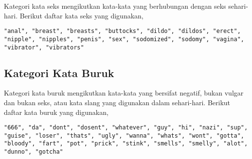 Kategori kata seks mengikutkan kata-kata yang berhubungan dengan seks
sehari-hari.
Berikut daftar kata seks yang digunakan,

\begin{lstlisting}
"anal", "breast", "breasts", "buttocks", "dildo", "dildos", "erect",
"nipple", "nipples", "penis", "sex", "sodomized", "sodomy", "vagina",
"vibrator", "vibrators"
\end{lstlisting}

\subsection{Kategori Kata Buruk}
\label{appendix:words_bad}

Kategori kata buruk mengikutkan kata-kata yang bersifat negatif, bukan vulgar
dan bukan seks, atau kata slang yang digunakan dalam sehari-hari.
Berikut daftar kata buruk yang digunakan,

\begin{lstlisting}
"666", "da", "dont", "dosent", "whatever", "guy", "hi", "nazi", "sup",
"guise", "loser", "thats", "ugly", "wanna", "whats", "wont", "gotta",
"bloody", "fart", "pot", "prick", "stink", "smells", "smelly", "alot",
"dunno", "gotcha"
\end{lstlisting}
